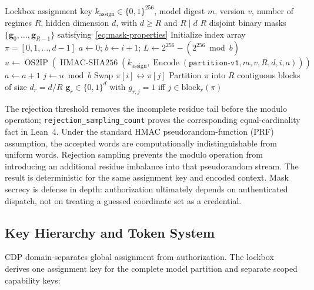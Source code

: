 \documentclass[11pt,a4paper]{article}
\newcommand{\bg}{\mathbf{g}}
\begin{document}
\begin{algorithm}[ht]
\caption{Global gate-partition assignment with unbiased draws}
\label{alg:gate-mask}
\begin{algorithmic}[1]
\Require Lockbox assignment key $k_{\mathrm{assign}} \in
\{0,1\}^{256}$, model digest $m$, version $v$, number of regimes
$R$, hidden dimension $d$, with $d \geq R$ and $R \mid d$
\Ensure $R$ disjoint binary masks
$\{\bg_0, \ldots, \bg_{R-1}\}$ satisfying~\eqref{eq:mask-properties}
\State Initialize index array $\pi = [0, 1, \ldots, d-1]$
 
    \State $a \gets 0$; $b \gets i+1$;
    $L \gets 2^{256}-(2^{256}\bmod b)$
    \Repeat
        \State $u \gets \operatorname{OS2IP}(\operatorname{HMAC\mbox{-}SHA256}(
        k_{\mathrm{assign}},
        \operatorname{Encode}(\texttt{partition-v1},m,v,R,d,i,a)))$
        \State $a \gets a+1$
     
    \State $j \gets u \bmod b$
    \State Swap $\pi[i] \leftrightarrow \pi[j]$
\EndFor
\State Partition $\pi$ into $R$ contiguous blocks of size
$d_r = d/R$
    \State $\bg_r \in \{0,1\}^d$ with $g_{r,j} = 1$ iff
    $j \in \text{block}_r(\pi)$
\EndFor
\end{algorithmic}
\end{algorithm}

The rejection threshold removes the incomplete residue tail before
the modulo operation; \texttt{rejection\_sampling\_count} proves the
corresponding equal-cardinality fact in Lean~4.  Under the standard
HMAC pseudorandom-function (PRF) assumption, the accepted words are
computationally indistinguishable from uniform words.  Rejection
sampling prevents the modulo operation from introducing an additional
residue imbalance into that pseudorandom stream.  The result is deterministic for
the same assignment key and encoded context.  Mask secrecy is defense
in depth: authorization ultimately depends on authenticated dispatch,
not on treating a guessed coordinate set as a credential.

\subsection{Key Hierarchy and Token System}
\label{sec:key-hierarchy}

CDP domain-separates global assignment from authorization.  The
lockbox derives one assignment key for the complete model partition
and separate scoped capability keys:
\end{document}
